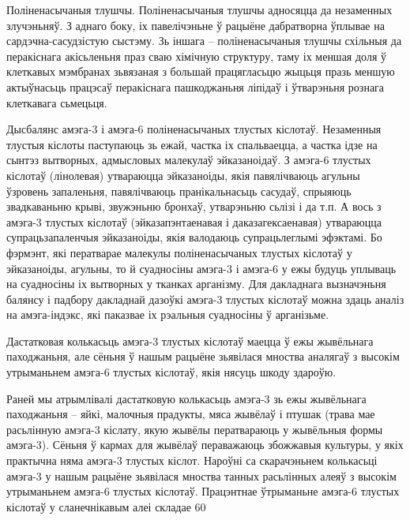 Поліненасычаныя тлушчы.
Поліненасычаныя тлушчы адносяцца да незаменных злучэньняў. З аднаго боку, іх павелічэньне ў рацыёне дабратворна ўплывае на сардэчна-сасудзістую сыстэму. Зь іншага – поліненасычаныя тлушчы схільныя да перакіснага акісьленьня праз сваю хімічную структуру, таму іх меншая доля ў клеткавых мэмбранах зьвязаная з большай працягласьцю жыцьця празь меншую актыўнасьць працэсаў перакіснага пашкоджаньня ліпідаў і ўтварэньня рознага клеткавага сьмецьця.

Дысбалянс амэга-3 і амэга-6 поліненасычаных тлустых кіслотаў.
Незаменныя тлустыя кіслоты паступаюць зь ежай, частка іх спальваецца, а частка ідзе на сынтэз вытворных, адмысловых малекулаў эйказаноідаў. З амэга-6 тлустых кіслотаў (лінолевая) утвараюцца эйказаноіды, якія павялічваюць агульны ўзровень запаленьня, павялічваюць пранікальнасьць сасудаў, спрыяюць звадкаваньню крыві, звужэньню бронхаў, утварэньню сьлізі і да т.п. А вось з амэга-3 тлустых кіслотаў (эйказапэнтаенавая і даказагексаенавая) утвараюцца супрацьзапаленчыя эйказаноіды, якія валодаюць супрацьлеглымі эфэктамі. Бо фэрмэнт, які ператварае малекулы поліненасычаных тлустых кіслотаў у эйказаноіды, агульны, то й суадносіны амэга-3 і амэга-6 у ежы будуць уплываць на суадносіны іх вытворных у тканках арганізму. Для дакладнага вызначэньня балянсу і падбору дакладнай дазоўкі амэга-3 тлустых кіслотаў можна здаць аналіз на амэга-індэкс, які паказвае іх рэальныя суадносіны ў арганізьме.

Дастатковая колькасьць амэга-3 тлустых кіслотаў маецца ў ежы жывёльнага паходжаньня, але сёньня ў нашым рацыёне зьявілася мноства аналягаў з высокім утрыманьнем амэга-6 тлустых кіслотаў, якія нясуць шкоду здароўю.

Раней мы атрымлівалі дастатковую колькасьць амэга-3 зь ежы жывёльнага паходжаньня – яйкі, малочныя прадукты, мяса жывёлаў і птушак (трава мае расьлінную амэга-3 кіслату, якую жывёлы ператвараюць у жывёльныя формы амэга-3). Сёньня ў кармах для жывёлаў пераважаюць збожжавыя культуры, у якіх практычна няма амэга-3 тлустых кіслот. Нароўні са скарачэньнем колькасьці амэга-3 у нашым рацыёне зьявілася мноства танных расьлінных алеяў з высокім утрыманьнем амэга-6 тлустых кіслотаў. Працэнтнае ўтрыманьне амэга-6 тлустых кіслотаў у сланечнікавым алеі складае 60%

